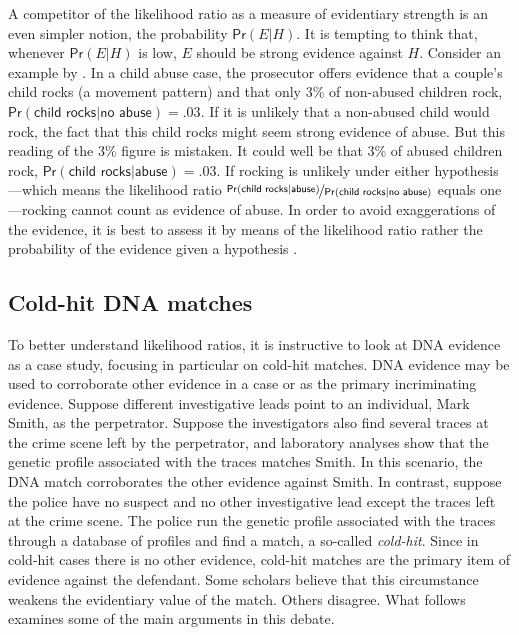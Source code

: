\documentclass{article}
\newcommand{\pr}{\mathsf{Pr}}
\begin{document}
A competitor of the likelihood ratio as a measure of evidentiary strength is an even simpler notion, the probability $\pr(E \vert H)$. It is tempting to think that, whenever $\pr(E \vert H)$ is low, 
$E$ should be strong evidence against 
$H$. 
Consider an example by \cite{robertson2016interpreting}. In a child abuse case, the prosecutor offers evidence that a couple's child rocks (a movement pattern) and that only 3\% of non-abused children rock, $\pr(\textsf{child rocks} \vert \textsf{no abuse})=.03$. If it is unlikely that a non-abused child would rock, the fact that this child rocks might seem strong evidence of abuse. But this reading of the 3\% figure is mistaken. It could well be that 
3\% of abused children rock, $\pr(\textsf{child rocks} \vert \textsf{abuse})=.03$. 
If rocking is unlikely under either hypothesis---which means the likelihood ratio 
 $\nicefrac{\pr(\textsf{child rocks} \vert \textsf{abuse})}{\pr(\textsf{child rocks} \vert \textsf{no abuse})}$ equals one---rocking cannot count as evidence of abuse. In order to avoid exaggerations of the evidence, it is best to assess it by means of the likelihood ratio rather the probability of the evidence given a hypothesis  \citep{Royall1997, triggsCommentWhyEffecta, enfs2015}. 

   
   
   
   \subsection{Cold-hit DNA matches}
 \label{subsec:cold-hit}
 
To better understand likelihood ratios, it is instructive to look at DNA evidence as a case study, focusing in particular on cold-hit matches. DNA evidence may be used to corroborate other evidence in a case or as the primary  incriminating evidence. Suppose different investigative leads point to an individual, Mark Smith, as the perpetrator. Suppose the investigators also find several traces at the crime scene left by the perpetrator, and laboratory analyses show that the genetic profile associated with the traces matches Smith. In this scenario, the DNA match corroborates the other evidence against Smith.  In contrast, suppose the police have no  suspect and no  other investigative lead except the traces left at the crime scene. The police run the genetic profile associated with the traces through a database of profiles and  find a match, a so-called  \textit{cold-hit}.
    Since in cold-hit cases there is no other evidence, cold-hit matches are  the primary item of evidence against the defendant. Some scholars believe that this circumstance weakens the evidentiary value of the match. Others disagree.  What follows examines some of the main arguments in this debate.
    
\end{document}
